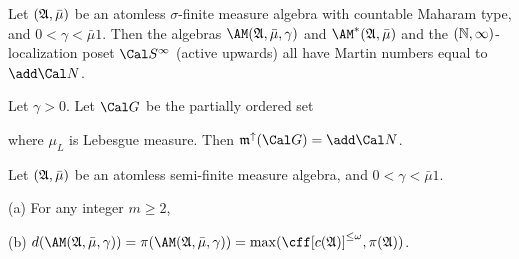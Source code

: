 Let $(\frak A,\bar\mu)$ be an atomless $\sigma$-finite measure algebra
with countable Maharam type, and $0<\gamma<\bar\mu 1$.   Then the
algebras $\AM(\frak A,\bar\mu,\gamma)$ and $\AM^*(\frak A,\bar\mu)$
and the $(\Bbb N,\infty)$-localization poset $\Cal S^{\infty}$ (active upwards)
all have Martin numbers equal to $\add\Cal N$.


 Let $\gamma>0$.   Let $\Cal G$ be the
partially ordered set


\noindent where $\mu_L$ is Lebesgue measure.   Then
$\frak m^{\uparrow}(\Cal G)=\add\Cal N$.


Let $(\frak A,\bar\mu)$ be an atomless
semi-finite measure algebra, and $0<\gamma<\bar\mu 1$.

(a) For any integer $m\ge 2$,


(b) $d(\AM(\frak A,\bar\mu,\gamma))
=\pi(\AM(\frak A,\bar\mu,\gamma))
=\max(\cff[c(\frak A)]^{\le\omega},\pi(\frak A))$.


